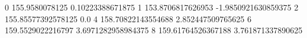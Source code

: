 0 155.9580078125 0.10223388671875
1 153.8706817626953 -1.9850921630859375
2 155.85577392578125 0.0
4 158.70822143554688 2.852447509765625
6 159.5529022216797 3.6971282958984375
8 159.61764526367188 3.761871337890625

